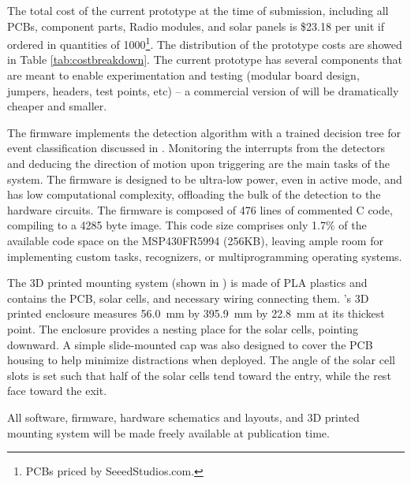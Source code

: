 The total cost of the current prototype at the time of submission, including all PCBs, component parts, Radio modules, and solar panels is \$23.18 per unit if ordered in quantities of 1000\footnote{PCBs priced by SeeedStudios.com.}.
The distribution of the prototype costs are showed in Table \ref{tab:costbreakdown}.
The current prototype has several components that are meant to enable experimentation and testing (modular board design, jumpers, headers, test points, etc) -- a commercial version of \sysname will be dramatically cheaper and smaller.



The \sysname firmware implements the detection algorithm with a trained decision tree for event classification discussed in .
Monitoring the interrupts from the detectors and deducing the direction of motion upon triggering are the main tasks of the system.
The firmware is designed to be ultra-low power, even in active mode, and has low computational complexity, offloading the bulk of the detection to the hardware circuits.
The \sysname firmware is composed of 476 lines of commented C code, compiling to a 4285 byte image. This code size comprises only 1.7\% of the available code space on the MSP430FR5994 (256KB), leaving ample room for implementing custom tasks, recognizers, or multiprogramming operating systems.

The 3D printed mounting system (shown in ) is made of PLA plastics and contains the PCB, solar cells, and necessary wiring connecting them.
\sysname's 3D printed enclosure measures \SI{56.0}{\milli\meter} by \SI{395.9}{\milli\meter} by \SI{22.8}{\milli\meter} at its thickest point. The enclosure provides a nesting place for the solar cells, pointing downward.  A simple slide-mounted cap was also designed to cover the PCB housing to help minimize distractions when deployed.
The angle of the solar cell slots is set such that half of the solar cells tend toward the entry, while the rest face toward the exit.

All software, firmware, hardware schematics and layouts, and 3D printed mounting system will be made freely available at publication time.
